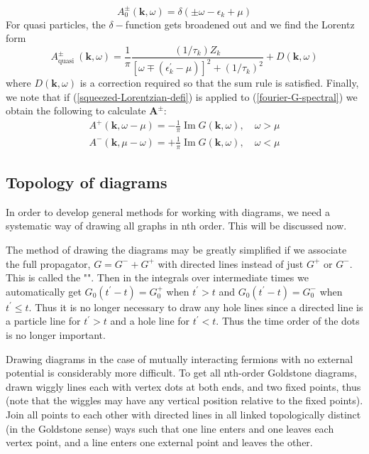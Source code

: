 \begin{equation}A_{0}^{\pm}(\mathbf{k}, \omega)=\delta\left(\pm \omega-\epsilon_{k}+\mu\right)\end{equation}
For quasi particles, the $\delta-$function gets broadened out and we find the Lorentz form
\begin{equation}A_{\text {quasi }}^{\pm}(\mathbf{k}, \omega)=\frac{1}{\pi} \frac{\left(1 / \tau_{k}\right) Z_{k}}{\left[\omega \mp\left(\epsilon_{k}^{\prime}-\mu\right)\right]^{2}+\left(1 / \tau_{k}\right)^{2}}+D(\mathbf{k}, \omega)\end{equation}
where $D(\mathbf{k},\omega)$ is a correction required so that the sum rule is satisfied. Finally, we note that if (\ref{squeezed-Lorentzian-defi}) is applied to (\ref{fourier-G-spectral}) we obtain the following to calculate $\mathbf{A}^{\pm}$:
\begin{equation}\begin{array}{l}
A^{+}(\mathbf{k}, \omega-\mu)=-\frac{1}{\pi} \operatorname{Im} G(\mathbf{k}, \omega), \quad \omega>\mu \\
A^{-}(\mathbf{k}, \mu-\omega)=+\frac{1}{\pi} \operatorname{Im} G(\mathbf{k}, \omega), \quad \omega<\mu
\end{array}\end{equation}

\subsection{Topology of diagrams}
In order to develop general methods for working with diagrams, we need a systematic way of drawing all graphs in nth order. This will be discussed now.

The method of drawing the diagrams may be greatly simplified if we associate the full propagator, $G=G^-+G^+$ with directed lines instead of just $G^+$ or $G^-$. This is called the "". Then in the integrals over intermediate times we automatically get $G_{0}\left(t^{\prime}-t\right)=G_{0}^{+}$ when $t^{\prime}>t$ and $G_{0}\left(t^{\prime}-t\right)=G_{0}^{-}$ when $t^{\prime} \leqslant t .$ Thus it is no longer
necessary to draw any hole lines since a directed line is a particle line for $t^{\prime}>t$ and a hole line for $t^{\prime}<t .$ Thus the time order of the dots is no longer important.

Drawing diagrams in the case of mutually interacting fermions with no external potential is considerably more difficult. To get all nth-order Goldstone diagrams, drawn wiggly lines each with vertex dots at both ends, and two fixed points, thus (note that the wiggles may have any vertical position relative to the fixed points). Join all points to each other with directed lines in all linked topologically distinct (in the Goldstone sense) ways such that one line enters and one leaves each vertex point, and a line enters one external point and leaves the other.

